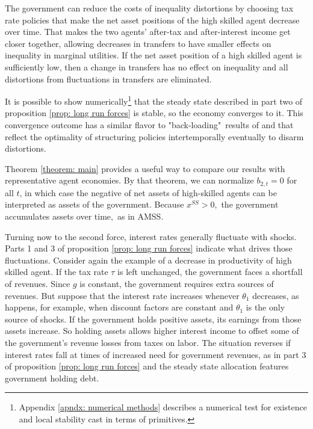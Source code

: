 \documentclass[thmsb,11pt]{article}
\begin{document}
{The government can reduce the costs of  inequality distortions by choosing
tax rate policies that make the net asset positions of  the high skilled agent
decrease over time. That makes the two agents'
after-tax and after-interest income  get closer
together, allowing decreases in transfers to have smaller effects on inequality in
marginal utilities. If the net asset position of a high skilled agent is
sufficiently low, then a change in transfers has no effect on inequality and
all  distortions from fluctuations in transfers are eliminated.

It is possible to show numerically\footnote{Appendix \ref{apndx: numerical methods} describes a numerical test for existence and local stability cast in terms of  primitives.} that the steady state described in part
two of  proposition \ref{prop: long run forces} is stable, so the  economy converges to it. This convergence outcome has
a similar flavor to "back-loading"\ results  of
\cite{Ray2002} and \cite{Albanesi2012} that reflect the  optimality of structuring policies intertemporally eventually to disarm  distortions.

Theorem \ref{theorem: main} provides  a useful way to compare our results with
 representative agent economies. By that theorem, we can normalize $%
b_{2,t}=0 $ for all $t$, in which case the negative of net assets of high-skilled agents can be
interpreted as assets of the government. Because $x^{SS}>0,$
the government  accumulates assets over time$,$ as in  AMSS.

Turning now to the second force,  interest rates generally fluctuate
with  shocks.  Parts 1 and 3 of  proposition \ref{prop: long run forces} indicate what drives those  fluctuations. Consider again the example of a
decrease in productivity of high skilled agent. If the  tax rate  $\tau $ is left unchanged,
the government faces a shortfall of revenues. Since
$g$ is constant, the
government requires  extra sources of revenues. But  suppose that
the interest rate increases whenever $\theta_1 $ decreases, as happens, for
example, when  discount factors are
constant and $\theta_1 $ is the only source of shocks. If the government holds positive assets, its earnings from those assets increase.
 So holding assets allows higher interest income
 to offset some of the government's revenue losses from taxes on labor.  The situation reverses if interest rates fall at
times of increased need for government revenues, as in
 part 3 of  proposition \ref{prop: long run forces} and the steady state allocation features government holding debt.

}
\end{document}
